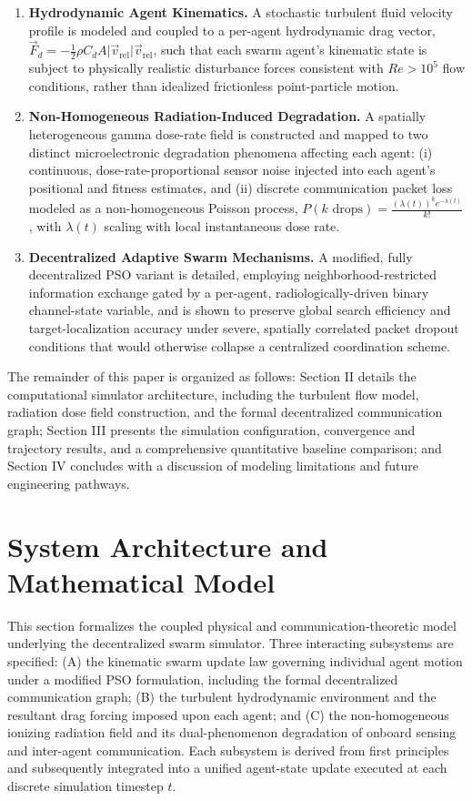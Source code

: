 \documentclass[journal]{IEEEtran}
\begin{document}
\begin{enumerate}
\item \textbf{Hydrodynamic Agent Kinematics.} A stochastic turbulent fluid velocity profile is modeled and coupled to a per-agent hydrodynamic drag vector, $\vec{F}_d = -\tfrac{1}{2}\rho C_d A \lvert \vec{v}_{\text{rel}} \rvert \vec{v}_{\text{rel}}$, such that each swarm agent's kinematic state is subject to physically realistic disturbance forces consistent with $Re > 10^5$ flow conditions, rather than idealized frictionless point-particle motion.
\item \textbf{Non-Homogeneous Radiation-Induced Degradation.} A spatially heterogeneous gamma dose-rate field is constructed and mapped to two distinct microelectronic degradation phenomena affecting each agent: (i) continuous, dose-rate-proportional sensor noise injected into each agent's positional and fitness estimates, and (ii) discrete communication packet loss modeled as a non-homogeneous Poisson process, $P(k \text{ drops}) = \frac{(\lambda(t))^k e^{-\lambda(t)}}{k!}$, with $\lambda(t)$ scaling with local instantaneous dose rate.
\item \textbf{Decentralized Adaptive Swarm Mechanisms.} A modified, fully decentralized PSO variant is detailed, employing neighborhood-restricted information exchange gated by a per-agent, radiologically-driven binary channel-state variable, and is shown to preserve global search efficiency and target-localization accuracy under severe, spatially correlated packet dropout conditions that would otherwise collapse a centralized coordination scheme.
\end{enumerate}

The remainder of this paper is organized as follows: Section II details the computational simulator architecture, including the turbulent flow model, radiation dose field construction, and the formal decentralized communication graph; Section III presents the simulation configuration, convergence and trajectory results, and a comprehensive quantitative baseline comparison; and Section IV concludes with a discussion of modeling limitations and future engineering pathways.

\section{System Architecture and Mathematical Model}
\label{sec:architecture}

This section formalizes the coupled physical and communication-theoretic model underlying the decentralized swarm simulator. Three interacting subsystems are specified: (A) the kinematic swarm update law governing individual agent motion under a modified PSO formulation, including the formal decentralized communication graph; (B) the turbulent hydrodynamic environment and the resultant drag forcing imposed upon each agent; and (C) the non-homogeneous ionizing radiation field and its dual-phenomenon degradation of onboard sensing and inter-agent communication. Each subsystem is derived from first principles and subsequently integrated into a unified agent-state update executed at each discrete simulation timestep $t$.
\end{document}
